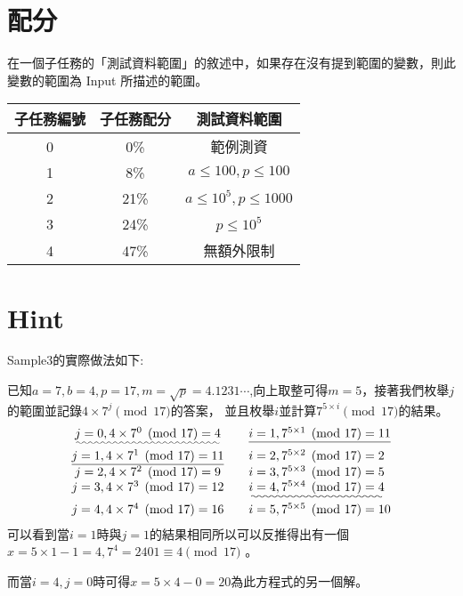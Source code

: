 \documentclass[11pt,a4paper]{article}
\begin{document}
\newpage
\section*{配分}

在一個子任務的「測試資料範圍」的敘述中，如果存在沒有提到範圍的變數，則此變數的範圍為 Input 所描述的範圍。

\begin{center}
 \begin{tabular}{||c c c||} 
 \hline
 子任務編號 & 子任務配分 & 測試資料範圍 \\  
 \hline\hline
 0 & 0\% & 範例測資 \\ 
 \hline
 1 & 8\% & $a \le  100,p \le 100$ \\
 \hline
 2 & 21\% & $a \le  10^5,p \le 1000$ \\
 \hline
 3 & 24\% & $p \le 10^5$ \\
 \hline
 4 & 47\% & 無額外限制 \\
 \hline
\end{tabular}
\end{center}

\section*{Hint}

Sample3的實際做法如下:

已知$a = 7 ,b = 4 ,p = 17 , m =\sqrt p = 4.1231\cdots$,向上取整可得$m = 5$，接著我們枚舉$j$的範圍並記錄$4 \times 7^{j} \pmod{17}$的答案，
並且枚舉$i$並計算$7^ {5 \times i} \pmod {17}$的結果。
$$
\begin{array}{clcr}
	\uwave{j = 0 ,4 \times 7^{0} \pmod{17} = 4} \quad &  \underline{i = 1 ,7^{5 \times 1} \pmod{17} = 11}  \\
	\underline{j = 1 ,4 \times 7^{1} \pmod{17} = 11} \quad &  i = 2 ,7^{5 \times 2} \pmod{17} = 2 \\
	j = 2 ,4 \times 7^{2} \pmod{17} = 9 \quad &  i = 3 ,7^{5 \times 3} \pmod{17} = 5 \\
	j = 3 ,4 \times 7^{3} \pmod{17} = 12 \quad & \uwave{i = 4 ,7^{5 \times 4} \pmod{17} = 4 } \\
	j = 4 ,4 \times 7^{4} \pmod{17} = 16 \quad &  i = 5 ,7^{5 \times 5} \pmod{17} = 10 \\
\end{array}
$$
可以看到當$i = 1$時與$j = 1$的結果相同所以可以反推得出有一個$x = 5 \times 1 - 1 = 4 , 7^ {4} = 2401 \equiv 4 \pmod {17}$ 。

而當$i = 4, j = 0$時可得$x = 5 \times 4 - 0 = 20$為此方程式的另一個解。
\end{document}

